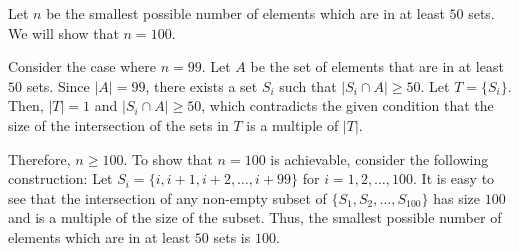 Let $n$ be the smallest possible number of elements which are in at least $50$ sets. We will show that $n=100$.

Consider the case where $n=99$. Let $A$ be the set of elements that are in at least $50$ sets. Since $|A|=99$, there exists a set $S_i$ such that $|S_i \cap A| \geq 50$. Let $T = \{S_i\}$. Then, $|T|=1$ and $|S_i \cap A| \geq 50$, which contradicts the given condition that the size of the intersection of the sets in $T$ is a multiple of $|T|$.

Therefore, $n \geq 100$. To show that $n=100$ is achievable, consider the following construction: Let $S_i = \{i, i+1, i+2, \ldots, i+99\}$ for $i=1,2,\ldots,100$. It is easy to see that the intersection of any non-empty subset of $\{S_1, S_2, \ldots, S_{100}\}$ has size $100$ and is a multiple of the size of the subset. Thus, the smallest possible number of elements which are in at least $50$ sets is $\boxed{100}$.
